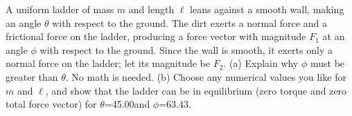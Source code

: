 A uniform ladder of mass $m$ and length $\ell$ leans against a
smooth wall, making an angle $\theta$ with respect to the ground.
The dirt exerts a normal force and a frictional force on the
ladder, producing a force vector with magnitude $F_1$ at an
angle $\phi$ with respect to the ground. Since the wall is
smooth, it exerts only a normal force on the ladder; let its
magnitude be $F_2$.\hwendpart
(a) Explain why $\phi$ must be greater than $\theta$. No math is needed.\hwendpart
(b) Choose any numerical values you like for $m$ and $\ell$, and
show that the ladder can be in equilibrium (zero torque and
zero total force vector) for $\theta$=45.00\degunit and $\phi$=63.43\degunit.
